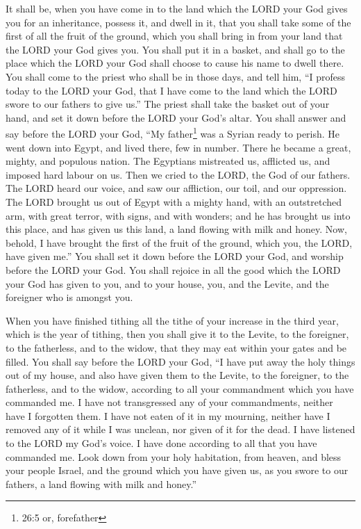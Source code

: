  It shall be, when you have come in to the land which the
LORD your God gives you for an inheritance, possess it, and dwell in it,
 that you shall take some of the first of all the fruit of
the ground, which you shall bring in from your land that the LORD your
God gives you. You shall put it in a basket, and shall go to the place
which the LORD your God shall choose to cause his name to dwell there.
 You shall come to the priest who shall be in those days,
and tell him, ``I profess today to the LORD your God, that I have come
to the land which the LORD swore to our fathers to give us.''
 The priest shall take the basket out of your hand, and set
it down before the LORD your God's altar.  You shall answer
and say before the LORD your God, ``My father\footnote{26:5 or,
  forefather} was a Syrian ready to perish. He went down into Egypt, and
lived there, few in number. There he became a great, mighty, and
populous nation.  The Egyptians mistreated us, afflicted us,
and imposed hard labour on us.  Then we cried to the LORD,
the God of our fathers. The LORD heard our voice, and saw our
affliction, our toil, and our oppression.  The LORD brought
us out of Egypt with a mighty hand, with an outstretched arm, with great
terror, with signs, and with wonders;  and he has brought us
into this place, and has given us this land, a land flowing with milk
and honey.  Now, behold, I have brought the first of the
fruit of the ground, which you, the LORD, have given me.'' You shall set
it down before the LORD your God, and worship before the LORD your God.
 You shall rejoice in all the good which the LORD your God
has given to you, and to your house, you, and the Levite, and the
foreigner who is amongst you.

 When you have finished tithing all the tithe of your
increase in the third year, which is the year of tithing, then you shall
give it to the Levite, to the foreigner, to the fatherless, and to the
widow, that they may eat within your gates and be filled. 
You shall say before the LORD your God, ``I have put away the holy
things out of my house, and also have given them to the Levite, to the
foreigner, to the fatherless, and to the widow, according to all your
commandment which you have commanded me. I have not transgressed any of
your commandments, neither have I forgotten them.  I have
not eaten of it in my mourning, neither have I removed any of it while I
was unclean, nor given of it for the dead. I have listened to the LORD
my God's voice. I have done according to all that you have commanded me.
 Look down from your holy habitation, from heaven, and
bless your people Israel, and the ground which you have given us, as you
swore to our fathers, a land flowing with milk and honey.''

